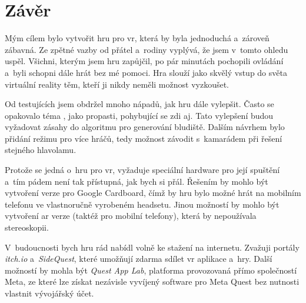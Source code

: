 \chapter*{Závěr}

Mým cílem bylo vytvořit hru pro \gls{vr}, která by byla jednoduchá a~zároveň zábavná. Ze zpětné vazby od přátel a~rodiny vyplývá, že jsem v~tomto ohledu uspěl. Všichni, kterým jsem hru zapůjčil, po pár minutách pochopili ovládání a~byli schopni dále hrát bez mé pomoci. Hra slouží jako skvělý vstup do světa virtuální reality těm, kteří ji nikdy neměli možnost vyzkoušet.

Od testujících jsem obdržel mnoho nápadů, jak hru dále vylepšit. Často se opakovalo téma , jako propasti, pohybující se zdi aj. Tato vylepšení budou vyžadovat zásahy do algoritmu pro generování bludiště. Dalším návrhem bylo přidání režimu pro více hráčů, tedy možnost závodit s~kamarádem při řešení stejného hlavolamu.

Protože se jedná o~hru pro \gls{vr}, vyžaduje speciální hardware pro její spuštění a~tím pádem není tak přístupná, jak bych si přál. Řešením by mohlo být vytvoření verze pro Google Cardboard, čímž by hru bylo možné hrát na mobilním telefonu ve vlastnoručně vyrobeném headsetu. Jinou možností by mohlo být vytvoření \gls{ar} verze (taktéž pro mobilní telefony), která by nepoužívala stereoskopii.

V~budoucnosti bych hru rád nabídl volně ke stažení na internetu. Zvažuji portály \textit{itch.io} a~\textit{SideQuest}, které umožňují zdarma sdílet \gls{vr} aplikace a~hry. Další možností by mohla být \textit{Quest App Lab}, platforma provozovaná přímo společností Meta, ze které lze získat nezávisle vyvíjený software pro Meta Quest bez nutnosti vlastnit vývojářský účet.